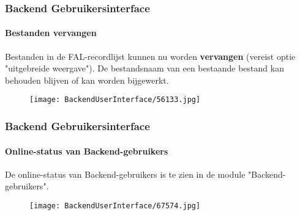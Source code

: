 \begin{frame}[fragile]
	\frametitle{Backend Gebruikersinterface}
	\framesubtitle{Bestanden vervangen}

	Bestanden in de FAL-recordlijst kunnen nu worden \textbf{vervangen} (vereist optie "uitgebreide weergave").
	De bestandsnaam van een bestaande bestand kan behouden blijven of kan worden bijgewerkt.

	\begin{figure}
		\texttt{[image: BackendUserInterface/56133.jpg]}
	\end{figure}

\end{frame}

\begin{frame}[fragile]
	\frametitle{Backend Gebruikersinterface}
	\framesubtitle{Online-status van Backend-gebruikers}

	De online-status van Backend-gebruikers is te zien in de module "Backend-gebruikers".

	\begin{figure}
		\texttt{[image: BackendUserInterface/67574.jpg]}
	\end{figure}

\end{frame}

